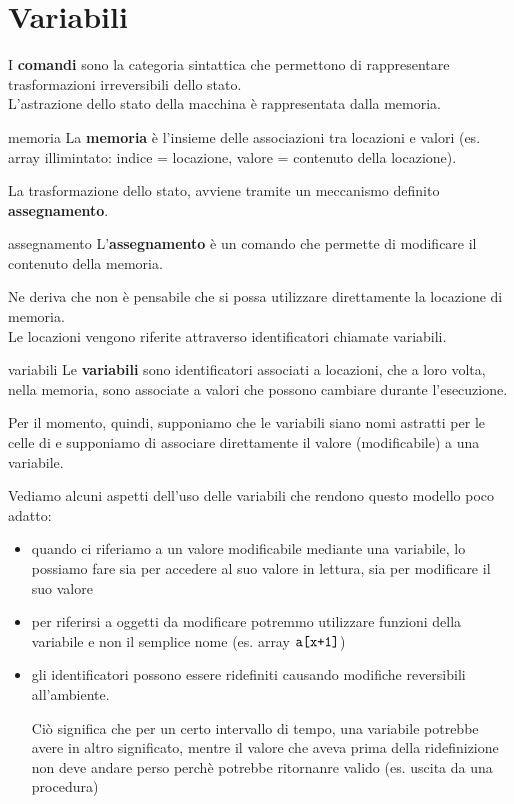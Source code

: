 
\chapter{Variabili}
I \textcolor{colore}{\textbf{comandi}} sono la categoria sintattica che permettono di rappresentare trasformazioni irreversibili dello stato.\\[0.2ex]
L'astrazione dello stato della macchina è rappresentata dalla memoria.

\begin{mydef}{memoria}
    La \textbf{memoria}  è l'insieme delle associazioni tra locazioni e valori (es. array illimintato: indice = locazione, valore = contenuto della locazione).
\end{mydef}

La trasformazione dello stato, avviene tramite un meccanismo definito \textbf{assegnamento}.

\begin{mydef}{assegnamento}
    L'\textbf{assegnamento} è un comando che permette di modificare il contenuto della memoria.
\end{mydef}

Ne deriva che non è pensabile che si possa utilizzare direttamente la locazione di memoria.\\[0.2ex]
Le locazioni vengono riferite attraverso identificatori chiamate variabili.

\begin{mydef}{variabili}
    Le \textbf{variabili} sono identificatori associati a locazioni, che a loro volta, nella memoria, sono associate a valori che possono cambiare durante l'esecuzione.
\end{mydef}

Per il momento, quindi, supponiamo che le variabili siano nomi astratti per le celle di e supponiamo di associare direttamente il valore (modificabile) a una variabile.

Vediamo alcuni aspetti dell'uso delle variabili che rendono questo modello poco adatto:
\begin{itemize}[label=$\triangleright$, itemsep=\medskipamount]
    \item quando ci riferiamo a un valore modificabile mediante una variabile, lo possiamo fare sia per accedere al suo valore in lettura, sia per modificare il suo valore
    \item per riferirsi a oggetti da modificare potremmo utilizzare funzioni della variabile e non il semplice nome (es. array $\verb|a[x+1]|$)
    \item gli identificatori possono essere ridefiniti causando modifiche reversibili all'ambiente.
    
    Ciò significa che per un certo intervallo di tempo, una variabile potrebbe avere in altro significato, mentre il valore che aveva prima della ridefinizione non deve andare perso perchè potrebbe ritornanre valido (es. uscita da una procedura)
\end{itemize}

